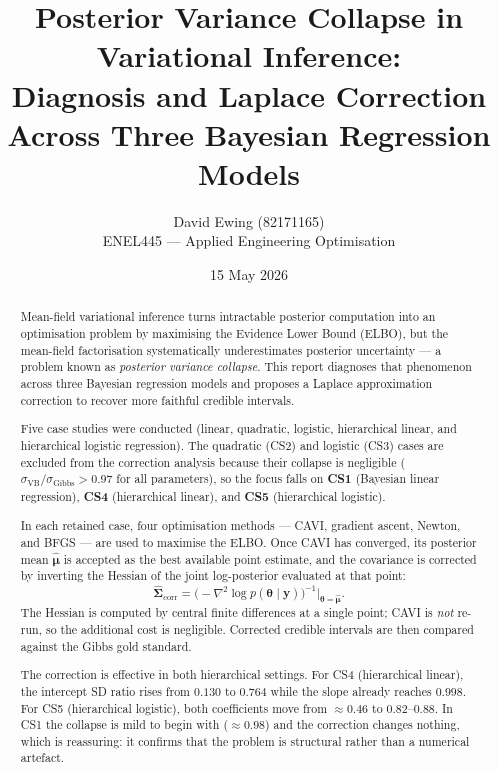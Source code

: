 \documentclass[11pt,a4paper]{article}
\title{
Posterior Variance Collapse in Variational Inference:\\
Diagnosis and Laplace Correction Across Three Bayesian Regression Models
}
\author{
  David Ewing (82171165)\\
  ENEL445 --- Applied Engineering Optimisation
}
\date{15 May 2026}
\begin{document}
\maketitle

\begin{abstract}
\setlength{\parindent}{0pt}
\setlength{\parskip}{0.7em}

Mean-field variational inference turns intractable posterior computation into an
optimisation problem by maximising the Evidence Lower Bound (ELBO), but the
mean-field factorisation systematically underestimates posterior uncertainty ---
a problem known as \emph{posterior variance collapse}.
This report diagnoses that phenomenon across three Bayesian regression models and
proposes a Laplace approximation correction to recover more faithful credible intervals.

Five case studies were conducted (linear, quadratic, logistic, hierarchical linear,
and hierarchical logistic regression).
The quadratic (CS2) and logistic (CS3) cases are excluded from the correction
analysis because their collapse is negligible
($\sigma_{\mathrm{VB}}/\sigma_{\mathrm{Gibbs}} > 0.97$ for all parameters), so the
focus falls on \textbf{CS1} (Bayesian linear regression),
\textbf{CS4} (hierarchical linear), and \textbf{CS5} (hierarchical logistic).

In each retained case, four optimisation methods --- CAVI, gradient ascent, Newton,
and BFGS --- are used to maximise the ELBO.
Once CAVI has converged, its posterior mean $\hat{\bm{\mu}}$ is accepted as the best
available point estimate, and the covariance is corrected by inverting the Hessian
of the joint log-posterior evaluated at that point:
\begin{equation*}
  \hat{\bm{\Sigma}}_{\mathrm{corr}}
  = \bigl(-\nabla^2 \log p(\bm{\theta}\mid\bm{y})\bigr)^{-1}\!\Big|_{\bm{\theta}=\hat{\bm{\mu}}}.
\end{equation*}
The Hessian is computed by central finite differences at a single point; CAVI is
\emph{not} re-run, so the additional cost is negligible.
Corrected credible intervals are then compared against the Gibbs gold standard.

The correction is effective in both hierarchical settings.
For CS4 (hierarchical linear), the intercept SD ratio rises from $0.130$ to $0.764$
while the slope already reaches $0.998$.
For CS5 (hierarchical logistic), both coefficients move from $\approx 0.46$ to
$0.82$--$0.88$.
In CS1 the collapse is mild to begin with ($\approx 0.98$) and the correction changes
nothing, which is reassuring: it confirms that the problem is structural rather than
a numerical artefact.
\end{abstract}
\end{document}
